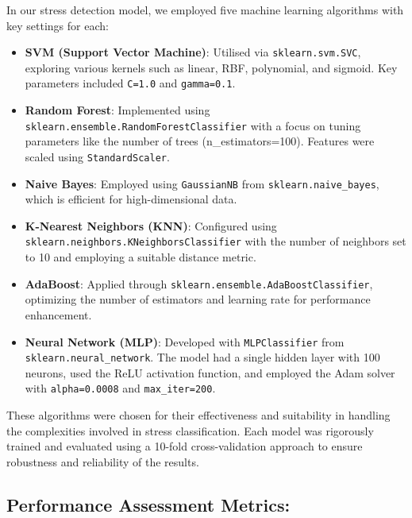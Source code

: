 In our stress detection model, we employed five machine learning algorithms with key settings for each:
\begin{itemize}
  \item \textbf{SVM (Support Vector Machine)}: Utilised via \texttt{sklearn.svm.SVC}, exploring various kernels such as linear, RBF, polynomial, and sigmoid. Key parameters included \texttt{C=1.0} and \texttt{gamma=0.1}.
  
  \item \textbf{Random Forest}: Implemented using \\ \texttt{sklearn.ensemble.RandomForestClassifier} with a focus on tuning parameters like the number of trees (n\_estimators=100). Features were scaled using \texttt{StandardScaler}.

  \item \textbf{Naive Bayes}: Employed using \texttt{GaussianNB} from \texttt{sklearn.naive\_bayes}, which is efficient for high-dimensional data.

  \item \textbf{K-Nearest Neighbors (KNN)}: Configured using \\ \texttt{sklearn.neighbors.KNeighborsClassifier} with the number of neighbors set to 10 and employing a suitable distance metric.

  \item \textbf{AdaBoost}: Applied through \texttt{sklearn.ensemble.AdaBoostClassifier}, optimizing the number of estimators and learning rate for performance enhancement.

  \item \textbf{Neural Network (MLP)}: Developed with \texttt{MLPClassifier} from \\ \texttt{sklearn.neural\_network}. The model had a single hidden layer with 100 neurons, used the ReLU activation function, and employed the Adam solver with \texttt{alpha=0.0008} and \texttt{max\_iter=200}.
\end{itemize}

These algorithms were chosen for their effectiveness and suitability in handling the complexities involved in stress classification. Each model was rigorously trained and evaluated using a 10-fold cross-validation approach to ensure robustness and reliability of the results.


\subsection*{Performance Assessment Metrics:}

